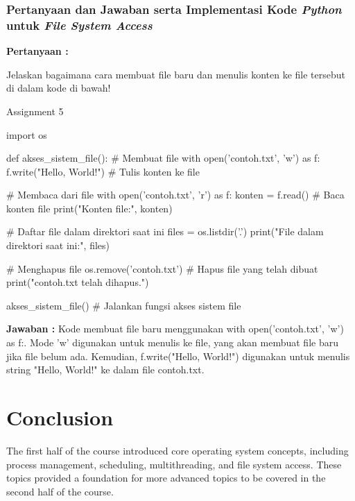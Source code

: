 \documentclass[12pt]{article}
\begin{document}
\subsubsection{Pertanyaan dan Jawaban serta Implementasi Kode \textit{Python} untuk \textit{File System Access}}

\textbf{Pertanyaan :}

\vspace{0.2cm}

Jelaskan bagaimana cara membuat file baru dan menulis konten ke file tersebut di dalam kode di bawah!

\vspace{0.2cm}

\begin{python}
Assignment 5

import os

def akses_sistem_file():
    # Membuat file
    with open('contoh.txt', 'w') as f:
        f.write("Hello, World!")  # Tulis konten ke file

    # Membaca dari file
    with open('contoh.txt', 'r') as f:
        konten = f.read()  # Baca konten file
        print("Konten file:", konten)

    # Daftar file dalam direktori saat ini
    files = os.listdir('.')
    print("File dalam direktori saat ini:", files)

    # Menghapus file
    os.remove('contoh.txt')  # Hapus file yang telah dibuat
    print("contoh.txt telah dihapus.")

akses_sistem_file()  # Jalankan fungsi akses sistem file
\end{python}

\textbf{Jawaban :} Kode membuat file baru menggunakan with open('contoh.txt', 'w') as f:. Mode 'w' digunakan untuk menulis ke file, yang akan membuat file baru jika file belum ada. Kemudian, f.write("Hello, World!") digunakan untuk menulis string "Hello, World!" ke dalam file contoh.txt.

\section{Conclusion}
The first half of the course introduced core operating system concepts, including process management, scheduling, multithreading, and file system access. These topics provided a foundation for more advanced topics to be covered in the second half of the course.
\end{document}
